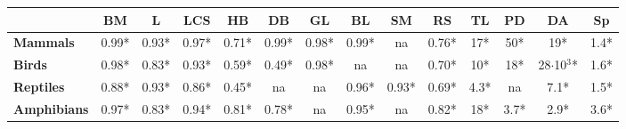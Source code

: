 \begin{table}[h!]
\begin{center}
\begin{tabular}{|l|c|c|c|c|c|c|c|c|c|c|c|c|c|}
\multicolumn{1}{|c|}{}                                & \textbf{BM}    & \textbf{L}   & \textbf{LCS}   & \textbf{HB}   & \textbf{DB}   & \textbf{GL}   & \textbf{BL}   & \textbf{SM}   & \textbf{RS}   & \textbf{TL}           & \textbf{PD}           & \textbf{DA}                & \textbf{Sp}          \\ \hline
\textbf{Mammals}                                      & 0.99*           & 0.93*        & 0.97*          & 0.71*         & 0.99*         & 0.98*         & 0.99*          & na            & 0.76*         & 17*                   & 50*                   & 19*                        & 1.4*                 \\ \hline
\textbf{Birds}                                        & 0.98*           & 0.83*        & 0.93*          & 0.59*         & 0.49*         & 0.98*         & na            & na            & 0.70*         & 10*                   & 18*                   & 28$\cdot$10$^3$*           & 1.6*                 \\ \hline
\textbf{Reptiles}                                     & 0.88*          & 0.93*        & 0.86*          & 0.45*         & na            & na            & 0.96*         & 0.93*         & 0.69*         & 4.3*                  & na                    & 7.1*                       & 1.5*                 \\ \hline
\textbf{Amphibians}                                   & 0.97*          & 0.83*        & 0.94*          & 0.81*         & 0.78*         & na            & 0.95*         & na            & 0.82*         & 18*                   & 3.7*                  & 2.9*                       & 3.6*                 \\ \hline
\end{tabular}
\end{center}
\end{table}


\pagebreak

